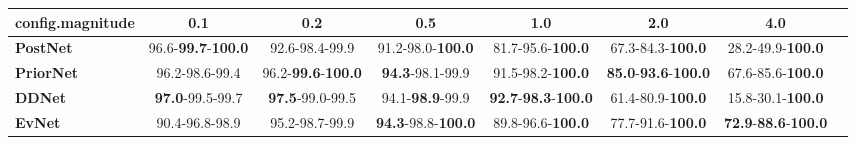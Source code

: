 \begin{tabular}{lccccccc}
\toprule
\textbf{config.magnitude} &                                0.1 &                                0.2 &                                0.5 &                                         1.0 &                                         2.0 &                                         4.0 \\
\midrule
\textbf{PostNet } &  96.6-\textbf{99.7}-\textbf{100.0} &                     92.6-98.4-99.9 &           91.2-98.0-\textbf{100.0} &                    81.7-95.6-\textbf{100.0} &                    67.3-84.3-\textbf{100.0} &                    28.2-49.9-\textbf{100.0} \\
\textbf{PriorNet} &                     96.2-98.6-99.4 &  96.2-\textbf{99.6}-\textbf{100.0} &            \textbf{94.3}-98.1-99.9 &                    91.5-98.2-\textbf{100.0} &  \textbf{85.0}-\textbf{93.6}-\textbf{100.0} &                    67.6-85.6-\textbf{100.0} \\
\textbf{DDNet   } &            \textbf{97.0}-99.5-99.7 &            \textbf{97.5}-99.0-99.5 &            94.1-\textbf{98.9}-99.9 &  \textbf{92.7}-\textbf{98.3}-\textbf{100.0} &                    61.4-80.9-\textbf{100.0} &                    15.8-30.1-\textbf{100.0} \\
\textbf{EvNet   } &                     90.4-96.8-98.9 &                     95.2-98.7-99.9 &  \textbf{94.3}-98.8-\textbf{100.0} &                    89.8-96.6-\textbf{100.0} &                    77.7-91.6-\textbf{100.0} &  \textbf{72.9}-\textbf{88.6}-\textbf{100.0} \\
\bottomrule
\end{tabular}
